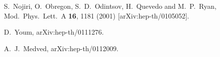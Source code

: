 \documentclass[a4paper,12pt]{article}
\begin{document}
\begin{thebibliography}{99}
S.~Nojiri, O.~Obregon, S.~D.~Odintsov, H.~Quevedo and M.~P.~Ryan,
Mod.\ Phys.\ Lett.\ A {\bf 16}, 1181 (2001)
[arXiv:hep-th/0105052].

D.~Youm,
arXiv:hep-th/0111276.

A.~J.~Medved,
arXiv:hep-th/0112009.











\end{thebibliography}
\end{document}
